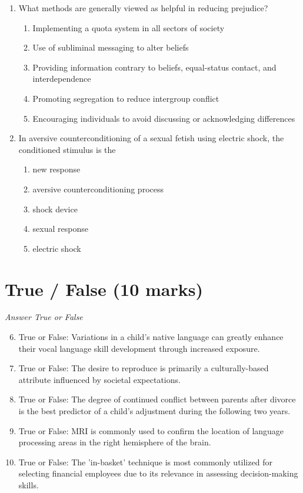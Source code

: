 \documentclass[12pt]{article}
\begin{document}
\begin{enumerate}[label=\arabic*.]
\begin{enumerate}[label=(\alph*)]
    \item most motor functions correlate highly and form 2 single factor
\end{enumerate}
\item What methods are generally viewed as helpful in reducing prejudice?
\begin{enumerate}[label=(\alph*)]
    \item Implementing a quota system in all sectors of society
    \item Use of subliminal messaging to alter beliefs
    \item Providing information contrary to beliefs, equal-status contact, and interdependence
    \item Promoting segregation to reduce intergroup conflict
    \item Encouraging individuals to avoid discussing or acknowledging differences
\end{enumerate}
\item In aversive counterconditioning of a sexual fetish using electric shock, the conditioned stimulus is the
\begin{enumerate}[label=(\alph*)]
    \item new response
    \item aversive counterconditioning process
    \item shock device
    \item sexual response
    \item electric shock
\end{enumerate}
\end{enumerate}

\section*{True / False (10 marks)}
\textit{Answer True or False}
\begin{enumerate}[label=\arabic*.]
\setcounter{enumi}{5}
\item True or False: Variations in a child's native language can greatly enhance their vocal language skill development through increased exposure.
\item True or False: The desire to reproduce is primarily a culturally-based attribute influenced by societal expectations.
\item True or False: The degree of continued conflict between parents after divorce is the best predictor of a child's adjustment during the following two years.
\item True or False: MRI is commonly used to confirm the location of language processing areas in the right hemisphere of the brain.
\item True or False: The 'in-basket' technique is most commonly utilized for selecting financial employees due to its relevance in assessing decision-making skills.
\end{enumerate}
\end{document}
